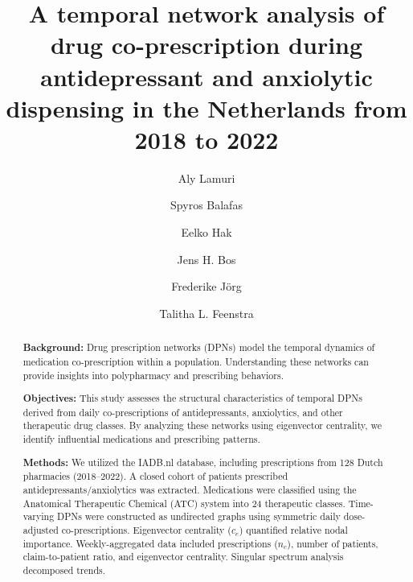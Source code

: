 \documentclass[
  authoryear,
  review]{elsarticle}
\begin{document}
\begin{frontmatter}
\title{A temporal network analysis of drug co-prescription during
antidepressant and anxiolytic dispensing in the Netherlands from 2018 to
2022}
\author[1,2]{Aly Lamuri%
%
}
\author[1]{Spyros Balafas%
%
}

\author[1]{Eelko Hak%
%
}

\author[1]{Jens H. Bos%
%
}

\author[1,3]{Frederike Jörg%
%
}

\author[1]{Talitha L. Feenstra%
%
}









        
\begin{abstract}
\textbf{Background:} Drug prescription networks (DPNs) model the
temporal dynamics of medication co-prescription within a population.
Understanding these networks can provide insights into polypharmacy and
prescribing behaviors.

\textbf{Objectives:} This study assesses the structural characteristics
of temporal DPNs derived from daily co-prescriptions of antidepressants,
anxiolytics, and other therapeutic drug classes. By analyzing these
networks using eigenvector centrality, we identify influential
medications and prescribing patterns.

\textbf{Methods:} We utilized the IADB.nl database, including
prescriptions from 128 Dutch pharmacies (2018--2022). A closed cohort of
patients prescribed antidepressants/anxiolytics was extracted.
Medications were classified using the Anatomical Therapeutic Chemical
(ATC) system into 24 therapeutic classes. Time-varying DPNs were
constructed as undirected graphs using symmetric daily dose-adjusted
co-prescriptions. Eigenvector centrality (\(c_e\)) quantified relative
nodal importance. Weekly-aggregated data included prescriptions
(\(n_c\)), number of patients, claim-to-patient ratio, and eigenvector
centrality. Singular spectrum analysis decomposed trends.


\end{abstract}
\end{frontmatter}
\end{document}
